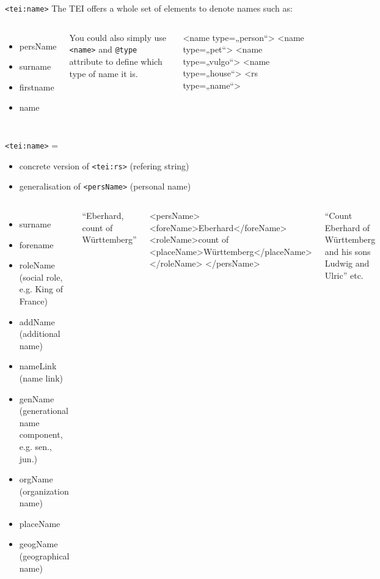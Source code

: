 \begin{frame}{\texttt{<tei:name>}}
The TEI offers a whole set of elements to denote names such as:


  \begin{columns}[T,onlytextwidth]
\begin{itemize}
    \item persName
    \item surname
    \item firstname
    \item name
\end{itemize}

You could also simply use \texttt{<name>} and \texttt{@type} attribute to define which type of name it is. 
\begin{xmlcode}
<name type=„person“>
<name type=„pet“>
<name type=„vulgo“>
<name type=„house“>
<rs type=„name“>
\end{xmlcode}
\end{columns}

\texttt{<tei:name>} = 
\begin{itemize}
    \item concrete version of \texttt{<tei:rs>} (refering string)
    \item generalisation of \texttt{<persName>} (personal name)
\end{itemize}

\framebreak

  \begin{columns}[T,onlytextwidth]
      \begin{itemize}
    \item surname 
    \item forename 
    \item roleName (social role, e.g. King of France)
    \item addName (additional name) 
    \item nameLink (name link)
    \item genName (generational name component, e.g. sen., jun.)
    \item orgName (organization name)
    \item placeName
    \item geogName (geographical name)
\end{itemize}


     ``Eberhard, count of Württemberg''
\begin{xmlcode}
<persName>
  <foreName>Eberhard</foreName>
  <roleName>count of
    <placeName>Württemberg</placeName>
  </roleName>
</persName>
\end{xmlcode}

``Count Eberhard of Württemberg and his sons Ludwig and Ulric'' etc.


  \end{columns}
\end{frame}





